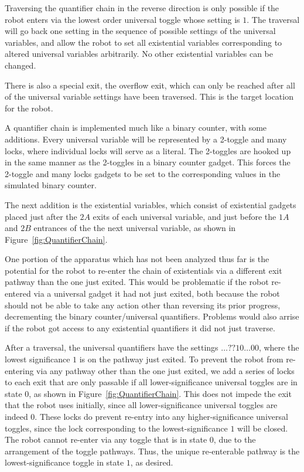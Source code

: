 Traversing  the quantifier chain in the reverse direction is only possible if the robot enters
via the lowest order universal toggle whose setting is $1$. The traversal will go back one setting in the
sequence of possible settings of the universal variables, and allow the robot to set all existential variables
corresponding to altered universal variables arbitrarily. No other existential variables can be changed.

There is also a special exit, the overflow exit, which can only be
reached after all of the universal variable settings have been traversed. This is the target location for the robot.

A quantifier chain is implemented much like a binary counter, with some additions. Every universal variable will be represented by a 2-toggle and many locks, where individual locks will serve as a literal. The 2-toggles are hooked up in the same manner as the 2-toggles in a binary counter gadget. This forces the 2-toggle and many locks gadgets to be set to the corresponding values in the simulated binary counter.

The next addition is the existential variables, which consist of existential gadgets placed just after the $2A$
exits of each universal variable,
and just before the $1A$ and $2B$ entrances of the the next universal variable, as shown
in Figure~\ref{fig:QuantifierChain}.

One portion of the apparatus which has not been analyzed thus far is the potential for the robot to re-enter the chain of existentials
via a different exit pathway than the one just exited. This would be problematic if the robot re-entered via a universal gadget it had not just exited,
both because the robot should not be able to take any action other than reversing its prior progress, 
decrementing the binary counter/universal quantifiers. Problems would also arrise if the robot got access to any existential quantifiers 
it did not just traverse.

After a traversal, the universal quantifiers have the settings $\ldots??10\ldots00$, where the lowest significance $1$ is 
on the pathway just exited.
To prevent the robot from re-entering via any pathway other than the one just exited, we add a series of locks to each exit that are only passable
if all lower-significance universal toggles are in state $0$, as shown in Figure~\ref{fig:QuantifierChain}.
This does not impede the exit that the robot uses initially, since all
lower-significance universal toggles are indeed $0$. These locks do prevent re-entry into any higher-significance universal toggles, since the
lock corresponding to the lowest-significance $1$ will be closed. The robot cannot re-enter via any toggle that is in state $0$,
due to the arrangement of the toggle pathways. Thus, the unique re-enterable pathway is the lowest-significance toggle in state $1$, as desired.

